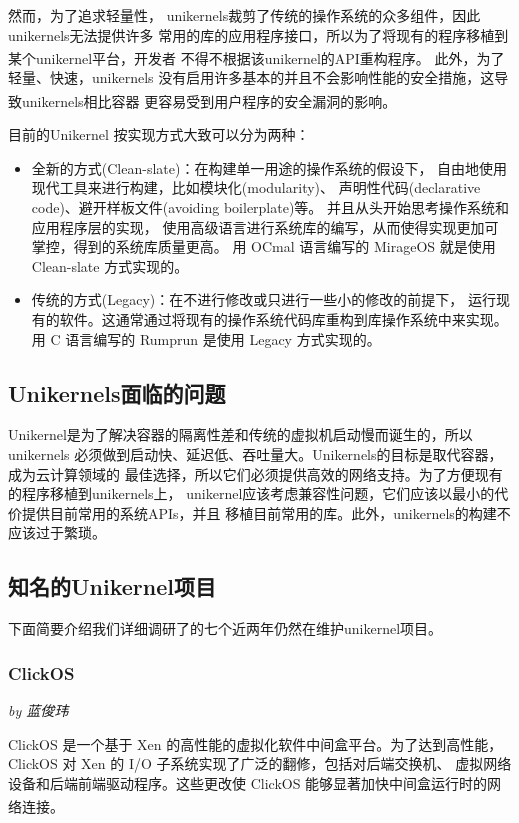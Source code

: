 \documentclass[UTF8,fontset=none,linespread=1.15]{ctexart}
\let\nosupcite\cite
\renewcommand*{\cite}[1]{\textsuperscript{\nosupcite{#1}}}
\newcommand{\sectionauthor}[1]{%
\vspace*{-5ex}
\noindent\textrm{\hfill\textit{by #1}}
\vspace*{2ex}\par}
\begin{document}
然而，为了追求轻量性，
unikernels裁剪了传统的操作系统的众多组件，因此unikernels无法提供许多
常用的库的应用程序接口，所以为了将现有的程序移植到某个unikernel平台，开发者
不得不根据该unikernel的API重构程序。\cite{bib:unikraft}
此外，为了轻量、快速，unikernels
没有启用许多基本的并且不会影响性能的安全措施，这导致unikernels相比容器
更容易受到用户程序的安全漏洞的影响。\cite{bib:unikernel-secuirty}

目前的Unikernel 按实现方式大致可以分为两种：
\begin{itemize}
\item 全新的方式(Clean-slate)：在构建单一用途的操作系统的假设下，
自由地使用现代工具来进行构建，比如模块化(modularity)、
声明性代码(declarative code)、避开样板文件(avoiding boilerplate)等。
并且从头开始思考操作系统和应用程序层的实现，
使用高级语言进行系统库的编写，从而使得实现更加可掌控，得到的系统库质量更高。
用 OCmal 语言编写的 MirageOS 就是使用 Clean-slate 方式实现的。
\item 传统的方式(Legacy)：在不进行修改或只进行一些小的修改的前提下，
运行现有的软件。这通常通过将现有的操作系统代码库重构到库操作系统中来实现。
用 C 语言编写的 Rumprun 是使用 Legacy 方式实现的。
\end{itemize}

\subsection{Unikernels面临的问题}
Unikernel是为了解决容器的隔离性差和传统的虚拟机启动慢而诞生的，所以unikernels
必须做到启动快、延迟低、吞吐量大。Unikernels的目标是取代容器，成为云计算领域的
最佳选择，所以它们必须提供高效的网络支持。为了方便现有的程序移植到unikernels上，
unikernel应该考虑兼容性问题，它们应该以最小的代价提供目前常用的系统APIs，并且
移植目前常用的库。此外，unikernels的构建不应该过于繁琐。

\subsection{知名的Unikernel项目}\label{subsec:famous-unikernel-projects}
下面简要介绍我们详细调研了的七个近两年仍然在维护unikernel项目。

\subsubsection{ClickOS}\sectionauthor{蓝俊玮}

ClickOS 是一个基于 Xen 的高性能的虚拟化软件中间盒平台。为了达到高性能，
ClickOS 对 Xen 的 I/O 子系统实现了广泛的翻修，包括对后端交换机、
虚拟网络设备和后端前端驱动程序。这些更改使 ClickOS 能够显著加快中间盒运行时的网络连接。\cite{bib:12-clickos}
\end{document}
